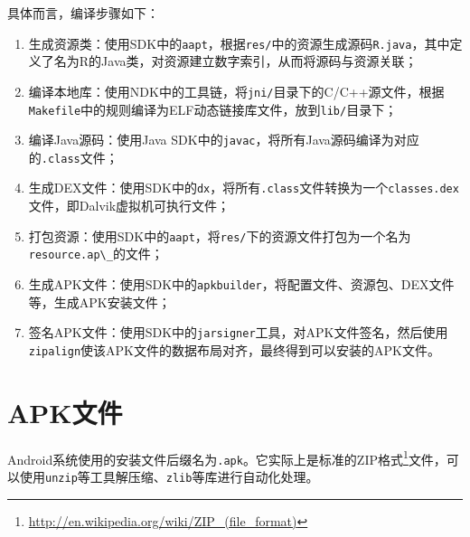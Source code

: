 具体而言，编译步骤如下：
\begin{enumerate}
  \item 生成资源类：使用SDK中的\lstinline!aapt!，根据\lstinline!res/!中的资源生成源码\lstinline!R.java!，其中定义了名为R的Java类，对资源建立数字索引，从而将源码与资源关联；
  \item 编译本地库：使用NDK中的工具链，将\lstinline!jni/!目录下的C/C++源文件，根据\lstinline!Makefile!中的规则编译为ELF动态链接库文件，放到\lstinline!lib/!目录下；
  \item 编译Java源码：使用Java SDK中的\lstinline!javac!，将所有Java源码编译为对应的\lstinline!.class!文件；
  \item 生成DEX文件：使用SDK中的\lstinline!dx!，将所有\lstinline!.class!文件转换为一个\lstinline!classes.dex!文件，即Dalvik虚拟机可执行文件；
  \item 打包资源：使用SDK中的\lstinline!aapt!，将\lstinline!res/!下的资源文件打包为一个名为\lstinline!resource.ap\_!的文件；
  \item 生成APK文件：使用SDK中的\lstinline!apkbuilder!，将配置文件、资源包、DEX文件等，生成APK安装文件；
  \item 签名APK文件：使用SDK中的\lstinline!jarsigner!工具，对APK文件签名，然后使用\lstinline!zipalign!使该APK文件的数据布局对齐，最终得到可以安装的APK文件。
\end{enumerate}

\section{APK文件}
Android系统使用的安装文件后缀名为\lstinline!.apk!。它实际上是标准的ZIP格式\footnote{\url{http://en.wikipedia.org/wiki/ZIP\_(file\_format)}}文件，可以使用\lstinline!unzip!等工具解压缩、\lstinline!zlib!等库进行自动化处理。

